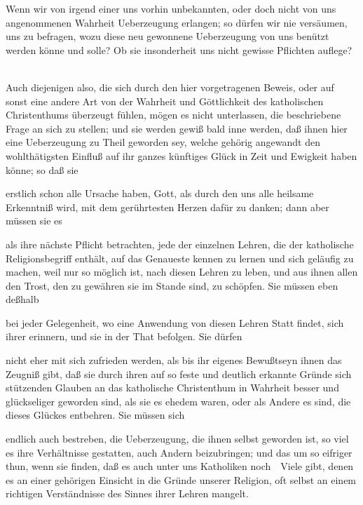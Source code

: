 \begin{aufza}
\item Wenn wir von irgend einer uns vorhin unbekannten, oder doch nicht von uns angenommenen Wahrheit Ueberzeugung erlangen; so dürfen wir nie versäumen, uns zu befragen, wozu diese neu gewonnene Ueberzeugung von uns benützt werden könne und solle? Ob sie insonderheit uns nicht gewisse Pflichten auflege? \usw\
\item Auch diejenigen also, die sich durch den hier vorgetragenen Beweis, oder auf sonst eine andere Art von der Wahrheit und Göttlichkeit des katholischen Christenthums überzeugt fühlen, mögen es nicht unterlassen, die beschriebene Frage an sich zu stellen; und sie werden gewiß bald inne werden, daß ihnen hier eine Ueberzeugung zu Theil geworden sey, welche gehörig angewandt den wohlthätigsten Einfluß auf ihr ganzes künftiges Glück in Zeit und Ewigkeit haben könne; so daß sie
\begin{aufzb}
\item erstlich schon alle Ursache haben, Gott, als durch den uns alle heilsame Erkenntniß wird, mit dem gerührtesten Herzen dafür zu danken; dann aber müssen sie es
\item als ihre nächste Pflicht betrachten, jede der einzelnen Lehren, die der katholische Religionsbegriff enthält, auf das Genaueste kennen zu lernen und sich geläufig zu machen, weil nur so möglich ist, nach diesen Lehren zu leben, und aus ihnen allen den Trost, den zu gewähren sie im Stande sind, zu schöpfen. Sie müssen eben deßhalb
\item bei jeder Gelegenheit, wo eine Anwendung von diesen Lehren Statt findet, sich ihrer erinnern, und sie in der That befolgen. Sie dürfen
\item nicht eher mit sich zufrieden werden, als bis ihr eigenes Bewußtseyn ihnen das Zeugniß gibt, daß sie durch ihren auf so feste und deutlich erkannte Gründe sich stützenden Glauben an das katholische Christenthum in Wahrheit besser und glückseliger geworden sind, als sie es ehedem waren, oder als Andere es sind, die dieses Glückes entbehren. Sie müssen sich
\item endlich auch bestreben, die Ueberzeugung, die ihnen selbst geworden ist, so viel es ihre Verhältnisse gestatten, auch Andern beizubringen; und das um so eifriger thun, wenn sie finden, daß es auch unter uns Katholiken noch~\RWSeitenw{406}\ Viele gibt, denen es an einer gehörigen Einsicht in die Gründe unserer Religion, oft selbst an einem richtigen Verständnisse des Sinnes ihrer Lehren mangelt.

\end{aufzb}
\end{aufza}
